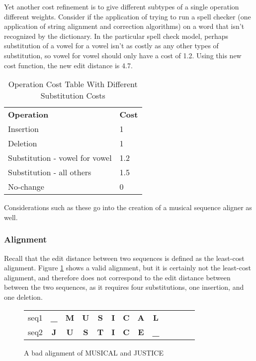 Yet another cost refinement is to give different subtypes of a single operation different weights. Consider if the application of trying to run a spell checker (one application of string alignment and correction algorithms) on a word that isn't recognized by the dictionary. In the particular spell check model, perhaps substitution of a vowel for a vowel isn't as costly as any other types of substitution, so vowel for vowel should only have a cost of 1.2. Using this new cost function, the new edit distance is 4.7.
\begin{table}[!h]
\centering
\begin{tabular}{ll}
\textbf{Operation}             & \textbf{Cost} \\
Insertion                      & 1             \\
Deletion                       & 1             \\
Substitution - vowel for vowel & 1.2           \\
Substitution - all others      & 1.5           \\
No-change                      & 0                
\end{tabular}
\caption{Operation Cost Table With Different Substitution Costs}
\label{my-label3}
\end{table}

Considerations such as these go into the creation of a musical sequence aligner as well. 
\subsubsection{Alignment}

Recall that the edit distance between two sequences is defined as the least-cost alignment. Figure \ref{badalign} shows a valid alignment, but it is certainly not the least-cost alignment, and therefore does not correspond to the edit distance between between the two sequences, as it requires four substitutions, one insertion, and one deletion.

\begin{figure}[!h]
\centering
\begin{tabular}{lcccccccccccc}
seq1 & {\color[HTML]{009901} \textbf{\_}} & {\color[HTML]{6200C9} \textbf{M}} & {\color[HTML]{6200C9} \textbf{U}} & {\color[HTML]{6200C9} \textbf{S}} & \textbf{I} & \textbf{C} & {\color[HTML]{6200C9} \textbf{A}} & {\color[HTML]{9A0000} \textbf{L}}  & \textbf{} & \textbf{} & \textbf{} &  \\
seq2 & {\color[HTML]{009901} \textbf{J}}  & {\color[HTML]{6200C9} \textbf{U}} & {\color[HTML]{6200C9} \textbf{S}} & {\color[HTML]{6200C9} \textbf{T}} & \textbf{I} & \textbf{C} & {\color[HTML]{6200C9} \textbf{E}} & {\color[HTML]{9A0000} \textbf{\_}} & \textbf{} & \textbf{} & \textbf{} & 
\end{tabular}
\caption{A bad alignment of MUSICAL and JUSTICE}
\label{badalign}
\end{figure}

